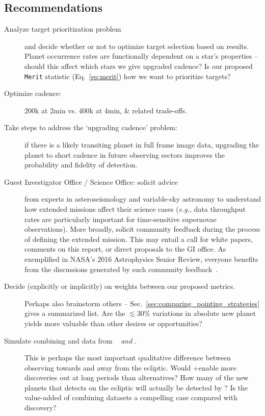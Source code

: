 \subsection{Recommendations}
\label{sec:recommendations}
\begin{description}
	\item[Analyze target prioritization problem] and decide whether or not to optimize target selection based on results. %
	Planet occurrence rates are functionally dependent on a star's properties -- should this affect which stars we give upgraded cadence?
	Is our proposed \texttt{Merit} statistic (Eq.~\ref{eq:merit}) how we want to prioritize targets?
	
	\item[Optimize cadence:] 200k at 2min vs. 400k at 4min, \& related trade-offs.
	
	\item[Take steps to address the `upgrading cadence' problem:] 
	if there is a likely transiting planet in full frame image data, upgrading the planet to short cadence in future observing sectors improves the probability and fidelity of detection.
	
	\item[Guest Investigator Office / \tess Science Office: solicit advice]
	from experts in asteroseismology and variable-sky astronomy to understand how extended missions affect their science cases (\textit{e.g.}, data throughput rates are particularly important for time-sensitive supernovae observations).
	More broadly, solicit community feedback during the process of defining the extended mission.
	This may entail a call for white papers, comments on this report, or direct proposals to the GI office. 
	As exemplified in NASA’s 2016 Astrophysics Senior Review, everyone benefits from the discussions generated by such community feedback~\citep{donahue_senior_2016}.
	
	\item[Decide (explicitly or implicitly) on weights between our proposed metrics.]
	Perhaps also brainstorm others -- Sec.~\ref{sec:comparing_pointing_strategies} gives a summarized list.
	Are the $\lesssim30\%$ variations in absolute new planet yields more valuable than other desires or opportunities?
	
	\item[Simulate combining \tess and \ktwo data from \rm{\elong\ } \textit{and} \rm{\eshort}.] 
	This is perhaps the most important qualitative difference between observing towards and away from the ecliptic.
	Would \tess\!+\ktwo enable more discoveries out at long periods than alternatives?
	How many of the new planets that \tess detects on the ecliptic will actually be detected by \ktwo?
	Is the value-added of combining datasets a compelling case compared with discovery?
	

\end{description}
